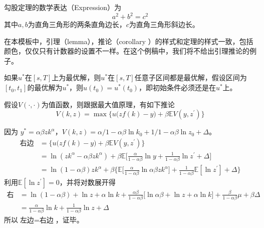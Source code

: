\documentclass[color=green,mathpazo,titlestyle=hang]{elegantbook}
\begin{document}
\begin{newthem}[勾股定理]
勾股定理的数学表达（Expression）为
\[a^2+b^2=c^2\]
其中$a,b$为直角三角形的两条直角边长，$c$为直角三角形斜边长。
\end{newthem}

\begin{note}
在本模板中，引理（lemma），推论（corollary ）的样式和定理的样式一致，包括颜色，仅仅只有计数器的设置不一样。在这个例稿中，我们将不给出引理推论的例子。
\end{note}


\lipsum[4]

\begin{newprop}[最优性原理]
如果$u^*$在$[s,T]$上为最优解，则$u^*$在$[s,T]$任意子区间都是最优解，假设区间为$[t_0,t_1]$的最优解为$u^*$，则$u(t_0)=u^{*}(t_0)$，即初始条件必须还是在$u^*$上。
\end{newprop}

\lipsum[5-6]
\begin{newcorol}
假设$V(\cdot,\cdot)$为值函数，则跟据最大值原理，有如下推论
\[
V(k,z)=\max\Big\{u\big(zf(k)-y\big)+\beta \mathbb{E}V(y,z^\prime)\Big\}
\]
\end{newcorol}

\begin{newproof}
因为 $y^*=\alpha\beta z k^\alpha$，$V(k,z)=\alpha/1-\alpha\beta\ln k_0+1/1-\alpha\beta \ln z_0+\Delta$。
\begin{align*}
\text{右边}&=\Big\{u\big(zf(k)-y\big)+\beta \mathbb{E}V(y,z^\prime)\Big\}\\
&=\ln(zk^\alpha-\alpha\beta zk^\alpha)+\beta\mathbb{E}\Big[\frac{\alpha}{1-\alpha\beta}\ln y+\frac{1}{1-\alpha\beta}\ln z^\prime+\Delta\Big]\\
&=\ln(1-\alpha\beta)zk^\alpha+\beta\Big\{\mathbb{E}\big[\frac{\alpha}{1-\alpha\beta}\ln \alpha\beta z k^\alpha\big]+\frac{1}{1-\alpha\beta}\mathbb{E}[\ln z^\prime]+\Delta\Big\}
\end{align*}
利用$\mathbb{E}[\ln z^\prime]=0$，并将对数展开得
\begin{align*}
\text{右边}&=\ln (1-\alpha\beta)+\ln z+\alpha\ln k+\frac{\alpha\beta}{1-\alpha\beta}\big[\ln \alpha\beta+\ln z+\alpha\ln k\big]+\frac{\beta}{1-\alpha\beta}\mu+\beta \Delta\\
&=\frac{\alpha}{1-\alpha\beta}\ln k+\frac{1}{1-\alpha\beta}\ln z+\Delta
\end{align*}
所以$\text{左边}=\text{右边}$，证毕。
\end{newproof}
\end{document}
